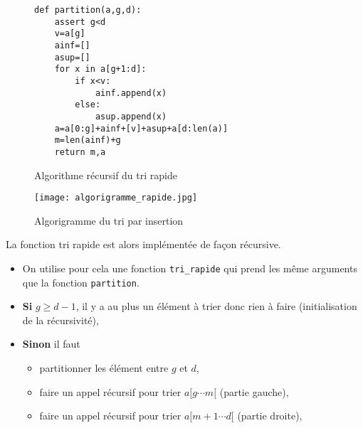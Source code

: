\begin{figure}[!htb]
\begin{minipage}{0.5\textwidth}
\begin{algorithme}

\begin{center}
\begin{lstlisting}
def partition(a,g,d):
    assert g<d
    v=a[g]
    ainf=[]
    asup=[]
    for x in a[g+1:d]:
        if x<v:
            ainf.append(x)
        else:
            asup.append(x)
    a=a[0:g]+ainf+[v]+asup+a[d:len(a)]
    m=len(ainf)+g
    return m,a
\end{lstlisting}
\end{center}


\end{algorithme}

\begin{algorithme}{Algorithme récursif du tri rapide}
\begin{center}
		
\end{center}
\end{algorithme}


\end{minipage}
\begin{minipage}{0.5\textwidth}
\begin{center}
\texttt{[image: algorigramme\_rapide.jpg]}
\caption{Algorigramme du tri par insertion}
\end{center}
\end{minipage}
\end{figure}
%
%
%

La fonction tri rapide est alors implémentée de façon récursive.
\begin{itemize}
\item On utilise pour cela une fonction \texttt{tri\_rapide} qui prend les même arguments que la fonction \texttt{partition}.
\item \textbf{Si} \textbf{$g\geq d-1$}, il y a au plus un élément à trier donc rien à faire (initialisation de la récursivité),
\item \textbf{Sinon} il faut
\begin{itemize}
\item partitionner les élément entre \textbf{$g$} et \textbf{$d$},
\item faire un appel récursif pour trier $a[g\cdots m[$ (partie gauche),
\item faire un appel récursif pour trier $a[m+1\cdots d[$ (partie droite),
\end{itemize} 
\end{itemize} 



